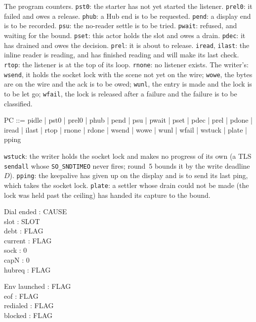 \documentclass[a4paper,10pt,fleqn]{article}
\begin{document}
The program counters.  \texttt{pst0}: the starter has not yet started the
listener.  \texttt{prel0}: it failed and owes a release.  \texttt{phub}: a Hub
end is to be requested.  \texttt{pend}: a display end is to be recorded.
\texttt{psu}: the no-reader settle is to be tried.  \texttt{pwait}: refused, and
waiting for the bound.  \texttt{pset}: this actor holds the slot and owes a
drain.  \texttt{pdec}: it has drained and owes the decision.  \texttt{prel}: it
is about to release.  \texttt{iread}, \texttt{ilast}: the inline reader is
reading, and has finished reading and will make its last check.  \texttt{rtop}:
the listener is at the top of its loop.  \texttt{rnone}: no listener exists.
The writer's: \texttt{wsend}, it holds the socket lock with the scene not yet on
the wire; \texttt{wowe}, the bytes are on the wire and the ack is to be owed;
\texttt{wunl}, the entry is made and the lock is to be let go; \texttt{wfail},
the lock is released after a failure and the failure is to be classified.

\begin{zed}
  PC ::= pidle | pst0 | prel0 | phub | pend | psu | pwait | pset | pdec | prel |
    pdone | iread | ilast | rtop | rnone | rdone | wsend | wowe | wunl | wfail |
    wstuck | plate | pping
\end{zed}

\texttt{wstuck}: the writer holds the socket lock and makes no progress of its
own (a TLS \texttt{sendall} whose \texttt{SO\_SNDTIMEO} never fires; round~5
bounds it by the write deadline $D$).  \texttt{pping}: the keepalive has given up
on the display and is to send its last ping, which takes the socket lock.
\texttt{plate}: a settler whose drain could not be made
(the lock was held past the ceiling) has handed its capture to the bound.

\begin{schema}{Dial}
  ended : CAUSE \\
  slot : SLOT \\
  debt : FLAG \\
  current : FLAG \\
  sock : 0  \\
  capN : 0  \\
  hubreq : FLAG
\end{schema}

\begin{schema}{Env}
  launched : FLAG \\
  eof : FLAG \\
  redialed : FLAG \\
  blocked : FLAG
\end{schema}
\end{document}
